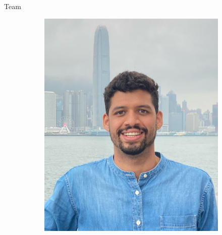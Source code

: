 \documentclass[aspectratio=169]{beamer}
\begin{document}
 \begin{frame}{Team}
  \vspace{1cm}
   \begin{figure}
       \captionsetup[subfigure]{justification=centering}
       \centering
       \begin{subfigure}[t]{0.3\textwidth}
           \centering
       \includegraphics[scale=.093]{profile.jpg}
       \end{subfigure}%
       ~~~
   \begin{subfigure}[t]{0.3\textwidth}
       \centering

\end{subfigure}
\end{figure}
\end{frame}
\end{document}
